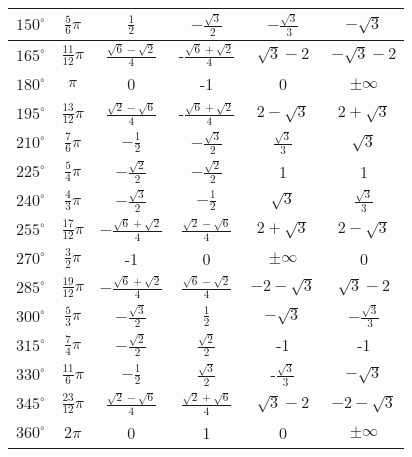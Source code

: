 \begin{tabular}{  | c | c || c | c | c | c | }
  	\hline
  	$150^{\circ}$     & $\frac{5}{6}\pi$     & $\frac{1}{2}$      &   $-\frac{\sqrt{3}}{2}$     &  $-\frac{\sqrt{3}}{3}$    &  $-\sqrt{3}$  \\
  	\hline	
    $165^{\circ}$     & $\frac{11}{12}\pi$   & $\frac{\sqrt{6}-\sqrt{2}}{4}$       &  -$\frac{\sqrt{6}+\sqrt{2}}{4}$     & $\sqrt{3}-2$   & $-\sqrt{3}-2$       \\
    \hline
    $180^{\circ}$     & $\pi$     & 0   &   -1   &  0    &  $\pm\infty$  \\
    \hline
	$195^{\circ}$     & $\frac{13}{12}\pi$   & $\frac{\sqrt{2}-\sqrt{6}}{4}$       &  -$\frac{\sqrt{6}+\sqrt{2}}{4}$     & $2-\sqrt{3}$   & $2+\sqrt{3}$       \\
	\hline
	$210^{\circ}$     & $\frac{7}{6}\pi$     & $-\frac{1}{2}$      &   $-\frac{\sqrt{3}}{2}$     &  $\frac{\sqrt{3}}{3}$    &  $\sqrt{3}$  \\
	\hline
  	$225^{\circ}$     & $\frac{5}{4}\pi$     & $-\frac{\sqrt{2}}{2}$      &   $-\frac{\sqrt{2}}{2}$     &  1    &  1  \\
  	\hline	
  	$240^{\circ}$     & $\frac{4}{3}\pi$     & $-\frac{\sqrt{3}}{2}$      &   $-\frac{1}{2}$     &  $\sqrt{3}$    &  $\frac{\sqrt{3}}{3}$  \\
  	\hline
     $255^{\circ}$     & $\frac{17}{12}\pi$   & $-\frac{\sqrt{6}+\sqrt{2}}{4}$       &  $\frac{\sqrt{2}-\sqrt{6}}{4}$     & $2+\sqrt{3}$   & $2-\sqrt{3}$       \\
     \hline
     $270^{\circ}$     & $\frac{3}{2}\pi$     & -1      &   0    &  $\pm\infty$    &  0  \\
     \hline	
    $285^{\circ}$     & $\frac{19}{12}\pi$   & $-\frac{\sqrt{6}+\sqrt{2}}{4}$       &  $\frac{\sqrt{6}-\sqrt{2}}{4}$     & $-2-\sqrt{3}$   & $\sqrt{3}-2$       \\
    \hline
    $300^{\circ}$     & $\frac{5}{3}\pi$     & $-\frac{\sqrt{3}}{2}$      &   $\frac{1}{2}$     &  $-\sqrt{3}$    &  $-\frac{\sqrt{3}}{3}$  \\
    \hline	
    $315^{\circ}$     & $\frac{7}{4}\pi$     & $-\frac{\sqrt{2}}{2}$      &   $\frac{\sqrt{2}}{2}$     &  -1   &  -1  \\
    \hline	
    $330^{\circ}$     & $\frac{11}{6}\pi$     & $-\frac{1}{2}$      &   $\frac{\sqrt{3}}{2}$     &  -$\frac{\sqrt{3}}{3}$   &  $-\sqrt{3}$  \\
    \hline	
     $345^{\circ}$     & $\frac{23}{12}\pi$     & $\frac{\sqrt{2}-\sqrt{6}}{4}$       &  $\frac{\sqrt{2}+\sqrt{6}}{4}$    &  $\sqrt{3}-2$    &  $-2-\sqrt{3}$  \\
     \hline	
     $360^{\circ}$     & $2\pi$   & 0       &  1     & 0   & $\pm\infty$       \\
     \hline
\end{tabular}
